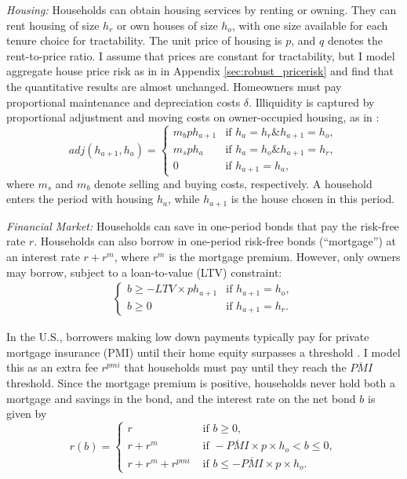 \documentclass[12pt]{article}
\begin{document}
\textit{Housing:} Households can obtain housing services by renting or owning. They can rent housing of size $h_r$ or own houses of size $h_o$, with one size available for each tenure choice for tractability. The unit price of housing is $p$, and $q$ denotes the rent-to-price ratio. I assume that prices are constant for tractability, but I model aggregate house price risk as in \cite{Corbae2015} in Appendix \ref{sec:robust_pricerisk} and find that the quantitative results are almost unchanged. Homeowners must pay proportional maintenance and depreciation costs $\delta$. Illiquidity is captured by proportional adjustment and moving costs on owner-occupied housing, as in \cite{Yang2009}:
\begin{equation}\label{eq:transcost}
adj(h_{a+1},h_a) = \begin{cases}
m_b p h_{a+1} & \text{if } h_{a}=h_r\mathbin{\&} h_{a+1}= h_o, \\
m_s p h_a 	& \text{if } h_a = h_o\mathbin{\&}h_{a+1}=h_r, \\
0 & \text{if } h_{a+1} = h_a,
\end{cases}
\end{equation} where $m_s$ and $m_b$ denote selling and buying costs, respectively. A household enters the period with housing $h_a$, while $h_{a+1}$ is the house chosen in this period. 

\textit{Financial Market:} Households can save in one-period bonds that pay the risk-free rate $r$. Households can also borrow in one-period risk-free bonds (``mortgage'') at an interest rate $r + r^m$, where $r^m$ is the mortgage premium. However, only owners may borrow, subject to a loan-to-value (LTV) constraint:
\begin{align*}
\begin{cases}
b\ge - LTV \times p h_{a+1} & \text{if } h_{a+1} = h_o, \\ 
b\ge 0 & \text{if } h_{a+1} = h_r.
\end{cases}
\end{align*}

In the U.S., borrowers making low down payments typically pay for private mortgage insurance (PMI) until their home equity surpasses a threshold \citep{goodman2017sixty}. I model this as an extra fee $r^{pmi}$ that households must pay until they reach the $\overline{PMI}$ threshold. Since the mortgage premium is positive, households never hold both a mortgage and savings in the bond, and the interest rate on the net bond $b$ is given by
\begin{equation}\label{eq:rb}
r(b) = \begin{cases}
r & \text{ if } b \ge 0, \\
r +r^m & \text{ if } -\overline{PMI}\times p\times h_o < b \le 0, \\
r +r^m +r^{pmi}& \text{ if } b \le -\overline{PMI}\times p\times h_o.
\end{cases}
\end{equation}
\end{document}
